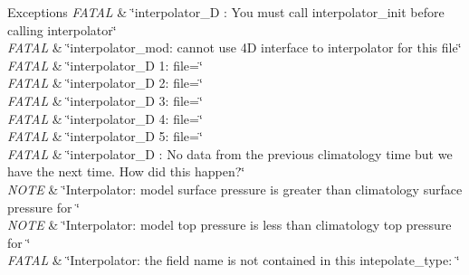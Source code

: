 \begin{DoxyExceptions}{Exceptions}
{\em F\+A\+T\+AL} & \char`\"{}interpolator\+\_\+D \+: You must call interpolator\+\_\+init
                before calling interpolator\char`\"{} \\
\hline
{\em F\+A\+T\+AL} & \char`\"{}interpolator\+\_\+mod\+: cannot use 4\+D interface to interpolator for this file\char`\"{} \\
\hline
{\em F\+A\+T\+AL} & \char`\"{}interpolator\+\_\+D 1\+:  file=\char`\"{} \\
\hline
{\em F\+A\+T\+AL} & \char`\"{}interpolator\+\_\+D 2\+:  file=\char`\"{} \\
\hline
{\em F\+A\+T\+AL} & \char`\"{}interpolator\+\_\+D 3\+:  file=\char`\"{} \\
\hline
{\em F\+A\+T\+AL} & \char`\"{}interpolator\+\_\+D 4\+:  file=\char`\"{} \\
\hline
{\em F\+A\+T\+AL} & \char`\"{}interpolator\+\_\+D 5\+:  file=\char`\"{} \\
\hline
{\em F\+A\+T\+AL} & \char`\"{}interpolator\+\_\+D \+: No data from the previous climatology
                time but we have the next time. How did this happen?\char`\"{} \\
\hline
{\em N\+O\+TE} & \char`\"{}\+Interpolator\+: model surface pressure is greater than
              climatology surface pressure for \char`\"{} \\
\hline
{\em N\+O\+TE} & \char`\"{}\+Interpolator\+: model top pressure is less than
                climatology top pressure for \char`\"{} \\
\hline
{\em F\+A\+T\+AL} & \char`\"{}\+Interpolator\+: the field name is not contained in this
                intepolate\+\_\+type\+: \char`\"{} \\
\hline
\end{DoxyExceptions}
\mbox{\label{interfaceinterpolator__mod_1_1interpolator_a962960829f0f07d3a87e017f0b5cd58d}} 
